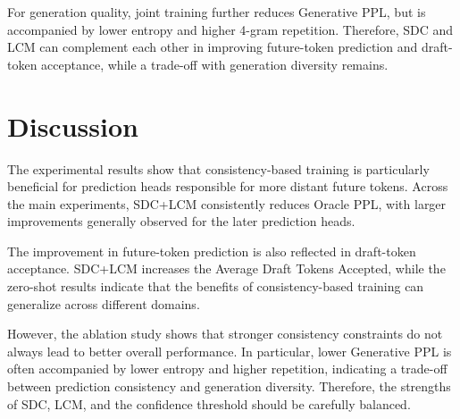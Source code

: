 For generation quality, joint training further reduces Generative PPL,
but is accompanied by lower entropy and higher 4-gram repetition.
Therefore, SDC and LCM can complement each other in improving future-token
prediction and draft-token acceptance, while a trade-off with generation
diversity remains.

\section{Discussion}\label{subsece:discussion}

The experimental results show that consistency-based training is particularly
beneficial for prediction heads responsible for more distant future tokens.
Across the main experiments, SDC+LCM consistently reduces Oracle PPL, with
larger improvements generally observed for the later prediction heads.

The improvement in future-token prediction is also reflected in draft-token
acceptance. SDC+LCM increases the Average Draft Tokens Accepted, while the
zero-shot results indicate that the benefits of consistency-based training
can generalize across different domains.

However, the ablation study shows that stronger consistency constraints do
not always lead to better overall performance. In particular, lower
Generative PPL is often accompanied by lower entropy and higher repetition,
indicating a trade-off between prediction consistency and generation
diversity. Therefore, the strengths of SDC, LCM, and the confidence threshold
should be carefully balanced.
